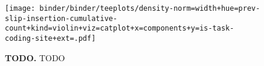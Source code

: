 \begin{figure}
\texttt{[image: binder/binder/teeplots/density-norm=width+hue=prev-slip-insertion-cumulative-count+kind=violin+viz=catplot+x=components+y=is-task-coding-site+ext=.pdf]}
\caption{%
  \textbf{TODO.}
  \footnotesize
  TODO
} \label{fig:potentiation}
\end{figure}

